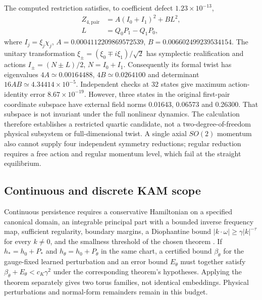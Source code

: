 The computed restriction satisfies, to coefficient defect $1.23\times10^{-13}$,
\begin{equation}
 \begin{aligned}
 Z_{4,\mathrm{pair}}&=A(I_0+I_1)^2+BL^2,\\
 L&=Q_0P_1-Q_1P_0,
 \end{aligned}
 \label{eq:learn-pair-form}
\end{equation}
where $I_j=\xi_j\chi_j$, $A=0.0004112209869572539$, $B=0.006602499239534154$. The unitary transformation $\xi_\pm=(\xi_0\mp i\xi_1)/\sqrt2$ has symplectic realification and actions $I_\pm=(N\pm L)/2$, $N=I_0+I_1$. Consequently its formal twist has eigenvalues $4A\simeq0.00164488$, $4B\simeq0.0264100$ and determinant $16AB\simeq4.34414\times10^{-5}$. Independent checks at 32 states give maximum action-identity error $8.67\times10^{-19}$. However, three states in the original first-pair coordinate subspace have external field norms 0.01643, 0.06573 and 0.26300. That subspace is not invariant under the full nonlinear dynamics. The calculation therefore establishes a restricted quartic candidate, not a two-degree-of-freedom physical subsystem or full-dimensional twist. A single axial $SO(2)$ momentum also cannot supply four independent symmetry reductions; regular reduction requires a free action and regular momentum level, which fail at the straight equilibrium.




\subsection{Continuous and discrete KAM scope}
Continuous persistence requires a conservative Hamiltonian on a specified canonical domain, an integrable principal part with a bounded inverse frequency map, sufficient regularity, boundary margins, a Diophantine bound $|k\cdot\omega|\ge\gamma|k|^{-\tau}$ for every $k\ne0$, and the smallness threshold of the chosen theorem \citep{Poschel2001}. If $h_*=h_0+P_*$ and $h_\theta=h_0+P_\theta$ in the same chart, a certified bound $\beta_\theta$ for the gauge-fixed learned perturbation and an error bound $E_\theta$ must together satisfy $\beta_\theta+E_\theta<c_K\gamma^2$ under the corresponding theorem's hypotheses. Applying the theorem separately gives two torus families, not identical embeddings. Physical perturbations and normal-form remainders remain in this budget.


